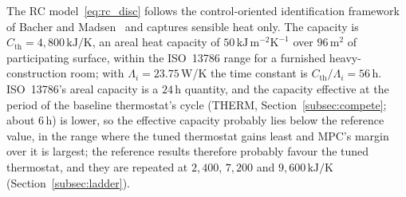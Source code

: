 \documentclass[3p,twocolumn,number]{elsarticle}
\newcommand{\Cth}{C_{\mathrm{th}}}
\begin{document}
\begin{remark}
\label{rem:rc}
The RC model~\eqref{eq:rc_disc} follows the control-oriented identification framework of Bacher and Madsen~\cite{Bacher2011} and captures sensible heat only. The capacity is $\Cth=4{,}800\,\text{kJ/K}$, an areal heat capacity of $50\,\text{kJ}\,\text{m}^{-2}\text{K}^{-1}$ over $96\,\text{m}^2$ of participating surface, within the ISO~13786 range for a furnished heavy-construction room; with $\Lambda_i=23.75\,$W/K the time constant is $\Cth/\Lambda_i=56\,$h. ISO~13786's areal capacity is a $24\,$h quantity, and the capacity effective at the period of the baseline thermostat's cycle (THERM, Section~\ref{subsec:compete}; about $6\,$h) is lower, so the effective capacity probably lies below the reference value, in the range where the tuned thermostat gains least and MPC's margin over it is largest; the reference results therefore probably favour the tuned thermostat, and they are repeated at $2{,}400$, $7{,}200$ and $9{,}600\,\text{kJ/K}$ (Section~\ref{subsec:ladder}).


\end{remark}
\end{document}
